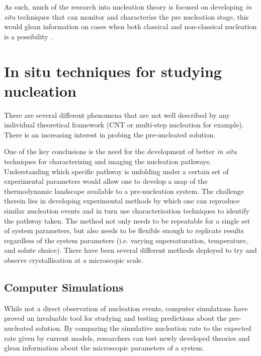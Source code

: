 As such, much of the research into nucleation theory is 
focused on developing \textit{in situ} techniques that can 
monitor and characterise the pre nucleation stage, this
would glean information on cases when both classical 
and non-classical nucleation is a possibility 
\cite{Karthika2016}. 

\section{In situ techniques for studying nucleation}
There are several different phenomena \cite{Fu2021, Karthika2016} 
that are not well described by any individual theoretical framework 
(CNT or multi-step nucleation for example). There is an increasing 
interest in probing the pre-nucleated solution.

One of the key conclusions is the need for the development of 
better \textit{in situ} techniques for characterizing and 
imaging the nucleation pathways. Understanding which specific 
pathway is unfolding under a certain set of experimental 
parameters would allow one to develop a map of the thermodynamic 
landscape available to a pre-nucleation system. The challenge 
therein lies in developing experimental methods by which one can 
reproduce similar nucleation events and in turn use 
characterisation techniques to identify the pathway taken. The 
method not only needs to be repeatable for a single set of system 
parameters, but also needs to be flexible enough to replicate 
results regardless of the system parameters (i.e. varying 
supersaturation, temperature, and solute choice). There have 
been several different methods deployed to try and observe 
crystallisation at a microscopic scale.

\subsection{Computer Simulations}
While not a direct observation of nucleation events, computer
simulations have proved an invaluable tool for studying and 
testing predictions about the pre-nucleated solution. By 
comparing the simulative nucleation rate to the expected 
rate given by current models, researchers can test newly 
developed theories and glean information about the microscopic
parameters of a system. 

